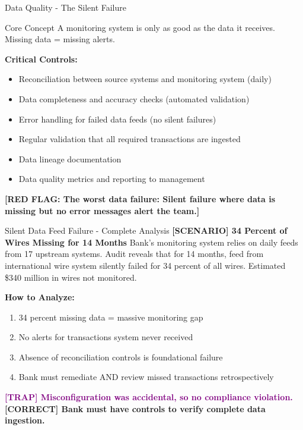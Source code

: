 \documentclass[11pt,a4paper]{beamer}
\newcommand{\trap}[1]{\textcolor{purple}{\textbf{[TRAP] #1}}}
\newcommand{\correct}[1]{\textcolor{green!50!black}{\textbf{[CORRECT] #1}}}
\newcommand{\scenario}[1]{\textcolor{blue!70!black}{\textbf{[SCENARIO] #1}}}
\newcommand{\redflag}[1]{\textcolor{red!80!black}{\textbf{[RED FLAG: #1]}}}
\begin{document}
	\begin{frame}{Data Quality - The Silent Failure}
		\begin{block}{Core Concept}
			A monitoring system is only as good as the data it receives. Missing data = missing alerts.
		\end{block}
		\textbf{Critical Controls:}
		\begin{itemize}
			\item Reconciliation between source systems and monitoring system (daily)
			\item Data completeness and accuracy checks (automated validation)
			\item Error handling for failed data feeds (no silent failures)
			\item Regular validation that all required transactions are ingested
			\item Data lineage documentation
			\item Data quality metrics and reporting to management
		\end{itemize}
		\redflag{The worst data failure: Silent failure where data is missing but no error messages alert the team.}
	\end{frame}
	
	\begin{frame}{Silent Data Feed Failure - Complete Analysis}
		\scenario{34 Percent of Wires Missing for 14 Months}
		Bank's monitoring system relies on daily feeds from 17 upstream systems. Audit reveals that for 14 months, feed from international wire system silently failed for 34 percent of all wires. Estimated \$340 million in wires not monitored.
		
		\vspace{0.1cm}
		\textbf{How to Analyze:}
		\begin{enumerate}
			\item 34 percent missing data = massive monitoring gap
			\item No alerts for transactions system never received
			\item Absence of reconciliation controls is foundational failure
			\item Bank must remediate AND review missed transactions retrospectively
		\end{enumerate}
		\trap{Misconfiguration was accidental, so no compliance violation.}
		\correct{Bank must have controls to verify complete data ingestion.}
	\end{frame}
	
\end{document}
